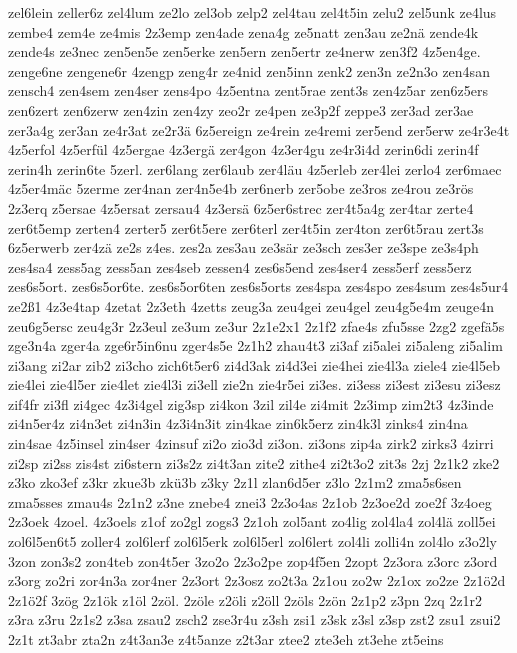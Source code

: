 {zel6lein
zeller6z
zel4lum
ze2lo
zel3ob
zelp2
zel4tau
zel4t5in
zelu2
zel5unk
ze4lus
zembe4
zem4e
ze4mis
2z3emp
zen4ade
zena4g
ze5natt
zen3au
ze2nä
zende4k
zende4s
ze3nec
zen5en5e
zen5erke
zen5ern
zen5ertr
ze4nerw
zen3f2
4z5en4ge.
zenge6ne
zengene6r
4zengp
zeng4r
ze4nid
zen5inn
zenk2
zen3n
ze2n3o
zen4san
zensch4
zen4sem
zen4ser
zens4po
4z5entna
zent5rae
zent3s
zen4z5ar
zen6z5ers
zen6zert
zen6zerw
zen4zin
zen4zy
zeo2r
ze4pen
ze3p2f
zeppe3
zer3ad
zer3ae
zer3a4g
zer3an
ze4r3at
ze2r3ä
6z5ereign
ze4rein
ze4remi
zer5end
zer5erw
ze4r3e4t
4z5erfol
4z5erfül
4z5ergae
4z3ergä
zer4gon
4z3er4gu
ze4r3i4d
zerin6di
zerin4f
zerin4h
zerin6te
5zerl.
zer6lang
zer6laub
zer4läu
4z5erleb
zer4lei
zerlo4
zer6maec
4z5er4mäc
5zerme
zer4nan
zer4n5e4b
zer6nerb
zer5obe
ze3ros
ze4rou
ze3rös
2z3erq
z5ersae
4z5ersat
zersau4
4z3ersä
6z5er6strec
zer4t5a4g
zer4tar
zerte4
zer6t5emp
zerten4
zerter5
zer6t5ere
zer6terl
zer4t5in
zer4ton
zer6t5rau
zert3s
6z5erwerb
zer4zä
ze2s
z4es.
zes2a
zes3au
ze3sär
ze3sch
zes3er
ze3spe
ze3s4ph
zes4sa4
zess5ag
zess5an
zes4seb
zessen4
zes6s5end
zes4ser4
zess5erf
zess5erz
zes6s5ort.
zes6s5or6te.
zes6s5or6ten
zes6s5orts
zes4spa
zes4spo
zes4sum
zes4s5ur4
ze2ß1
4z3e4tap
4zetat
2z3eth
4zetts
zeug3a
zeu4gei
zeu4gel
zeu4g5e4m
zeuge4n
zeu6g5ersc
zeu4g3r
2z3eul
ze3um
ze3ur
2z1e2x1
2z1f2
zfae4s
zfu5sse
2zg2
zgefä5s
zge3n4a
zger4a
zge6r5in6nu
zger4s5e
2z1h2
zhau4t3
zi3af
zi5alei
zi5aleng
zi5alim
zi3ang
zi2ar
zib2
zi3cho
zich6t5er6
zi4d3ak
zi4d3ei
zie4hei
zie4l3a
ziele4
zie4l5eb
zie4lei
zie4l5er
zie4let
zie4l3i
zi3ell
zie2n
zie4r5ei
zi3es.
zi3ess
zi3est
zi3esu
zi3esz
zif4fr
zi3fl
zi4gec
4z3i4gel
zig3sp
zi4kon
3zil
zil4e
zi4mit
2z3imp
zim2t3
4z3inde
zi4n5er4z
zi4n3et
zi4n3in
4z3i4n3it
zin4kae
zin6k5erz
zin4k3l
zinks4
zin4na
zin4sae
4z5insel
zin4ser
4zinsuf
zi2o
zio3d
zi3on.
zi3ons
zip4a
zirk2
zirks3
4zirri
zi2sp
zi2ss
zis4st
zi6stern
zi3s2z
zi4t3an
zite2
zithe4
zi2t3o2
zit3s
2zj
2z1k2
zke2
z3ko
zko3ef
z3kr
zkue3b
zkü3b
z3ky
2z1l
zlan6d5er
z3lo
2z1m2
zma5s6sen
zma5sses
zmau4s
2z1n2
z3ne
znebe4
znei3
2z3o4as
2z1ob
2z3oe2d
zoe2f
3z4oeg
2z3oek
4zoel.
4z3oels
z1of
zo2gl
zogs3
2z1oh
zol5ant
zo4lig
zol4la4
zol4lä
zoll5ei
zol6l5en6t5
zoller4
zol6lerf
zol6l5erk
zol6l5erl
zol6lert
zol4li
zolli4n
zol4lo
z3o2ly
3zon
zon3s2
zon4teb
zon4t5er
3zo2o
2z3o2pe
zop4f5en
2zopt
2z3ora
z3orc
z3ord
z3org
zo2ri
zor4n3a
zor4ner
2z3ort
2z3osz
zo2t3a
2z1ou
zo2w
2z1ox
zo2ze
2z1ö2d
2z1ö2f
3zög
2z1ök
z1öl
2zöl.
2zöle
z2öli
z2öll
2zöls
2zön
2z1p2
z3pn
2zq
2z1r2
z3ra
z3ru
2z1s2
z3sa
zsau2
zsch2
zse3r4u
z3sh
zsi1
z3sk
z3sl
z3sp
zst2
zsu1
zsui2
2z1t
zt3abr
zta2n
z4t3an3e
z4t5anze
z2t3ar
ztee2
zte3eh
zt3ehe
zt5eins
}
